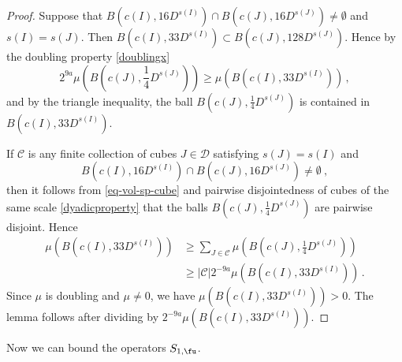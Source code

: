 \begin{proof}
    Suppose that $B(c(I), 16 D^{s(I)}) \cap B(c(J), 16 D^{s(J)}) \ne \emptyset$ and $s(I) = s(J)$. Then $B(c(I), 33 D^{s(I)}) \subset B(c(J), 128 D^{s(J)})$. Hence by the doubling property \eqref{doublingx}
    $$
        2^{9a}\mu(B(c(J), \frac{1}{4}D^{s(J)})) \ge \mu(B(c(I), 33 D^{s(I)}))\,,
    $$
    and by the triangle inequality, the ball $B(c(J), \frac{1}{4}D^{s(J)})$ is contained in $B(c(I), 33 D^{s(I)})$.

    If $\mathcal{C}$ is any finite collection of cubes $J \in \mathcal{D}$ satisfying $s(J) = s(I)$ and
    \begin{equation*}
        B(c(I), 16 D^{s(I)}) \cap B(c(J), 16 D^{s(J)}) \ne\emptyset\ ,
    \end{equation*} then it follows from \eqref{eq-vol-sp-cube} and pairwise disjointedness of cubes of the same scale \eqref{dyadicproperty} that the balls $B(c(J), \frac{1}{4} D^{s(J)})$ are pairwise disjoint. Hence
    \begin{align*}
        \mu(B(c(I), 33 D^{s(I)})) &\ge \sum_{J \in \mathcal{C}} \mu(B(c(J), \frac{1}{4}D^{s(J)}))\\
        &\ge |\mathcal{C}| 2^{-9a} \mu(B(c(I), 33 D^{s(I)}))\,.
    \end{align*}
    Since $\mu$ is doubling and $\mu \ne 0$, we have $\mu(B(c(I), 33D^{s(I)})) > 0$. The lemma follows after dividing by $2^{-9a}\mu(B(c(I), 33D^{s(I)}))$.
\end{proof}

Now we can bound the operators $S_{1, \fu}$.

